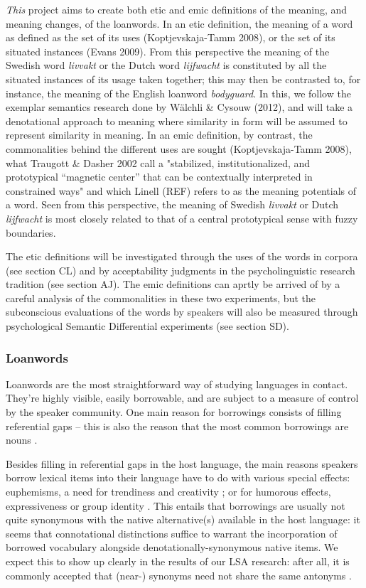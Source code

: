 \documentclass[a4paper]{article}
\begin{document}
\emph{This} project aims to create both etic and emic definitions of the meaning, and meaning changes, of the loanwords. In an etic definition, the meaning of a word as defined as the set of its uses (Koptjevskaja-Tamm 2008), or the set of its situated instances (Evans 2009). From this perspective the meaning of the Swedish word \emph{livvakt} or the Dutch word \emph{lijfwacht} is constituted by all the situated instances of its usage taken together; this may then be contrasted to, for instance, the meaning of the English loanword \emph{bodyguard}. In this, we follow the exemplar semantics research done by W\"alchli \& Cysouw (2012), and will take a denotational approach to meaning where similarity in form will be assumed to represent similarity in meaning. In an emic definition, by contrast, the commonalities behind the different uses are sought (Koptjevskaja-Tamm 2008), what Traugott \& Dasher 2002 call a "stabilized, institutionalized, and prototypical “magnetic center” that can be contextually interpreted in constrained ways" and which Linell (REF) refers to as the meaning potentials of a word. Seen from this perspective, the meaning of Swedish \emph{livvakt} or Dutch \emph{lijfwacht} is most closely related to that of a central prototypical sense with fuzzy boundaries.

The etic definitions will be investigated through the uses of the words in corpora (see section CL) and by acceptability judgments in the psycholinguistic research tradition (see section AJ). The emic definitions can aprtly be arrived of by a careful analysis of the commonalities in these two experiments, but the subconscious evaluations of the words by speakers will also be measured through psychological Semantic Differential experiments (see section SD).




\subsubsection{Loanwords}
\label{sect_loanwords}
Loanwords are the most straightforward way of studying languages in contact. They're highly visible, easily borrowable, and are subject to a measure of control by the speaker community. One main reason for borrowings consists of filling referential gaps -- this is also the reason that the most common borrowings are nouns \citep[cf.][p.168]{Matras2009}.

Besides filling in referential gaps in the host language, the main reasons speakers borrow lexical items into their language have to do with various special effects: euphemisms, a need for trendiness and creativity \citep[cf.][]{Rebuck2002}; or for humorous effects, expressiveness or group identity \citep[cf.][]{Gottlieb2006,Wennberg2010}. This entails that borrowings are usually not quite synonymous with the native alternative(s) available in the host language: it seems that connotational distinctions suffice to warrant the incorporation of borrowed vocabulary alongside denotationally-synonymous native items. We expect this to show up clearly in the results of our LSA research: after all, it is commonly accepted that (near-) synonyms need not share the same antonyms \citep[cf.][]{Miller1990}. 
\end{document}
